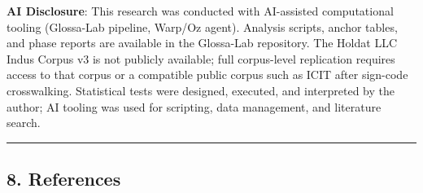 \documentclass[
  11pt,
]{article}
\begin{document}
\textbf{AI Disclosure}: This research was conducted with AI-assisted
computational tooling (Glossa-Lab pipeline, Warp/Oz agent). Analysis
scripts, anchor tables, and phase reports are available in the
Glossa-Lab repository. The Holdat LLC Indus Corpus v3 is not publicly
available; full corpus-level replication requires access to that corpus
or a compatible public corpus such as ICIT after sign-code crosswalking.
Statistical tests were designed, executed, and interpreted by the
author; AI tooling was used for scripting, data management, and
literature search.

\begin{center}\rule{0.5\linewidth}{0.5pt}\end{center}

\subsection{8. References}\label{references}
\end{document}
